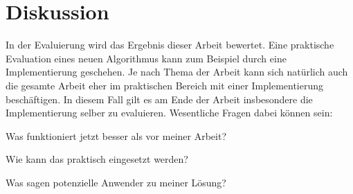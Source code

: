 
\chapter{Diskussion}
\label{chapter:diskussion}

In der Evaluierung wird das Ergebnis dieser Arbeit bewertet. Eine praktische Evaluation eines neuen Algorithmus kann zum Beispiel durch eine Implementierung geschehen. Je nach Thema der Arbeit kann sich natürlich auch die gesamte Arbeit eher im praktischen Bereich mit einer Implementierung beschäftigen. In diesem Fall gilt es am Ende der Arbeit insbesondere die Implementierung selber zu evaluieren. Wesentliche Fragen dabei können sein:
\begin{compactitem}[--]
  \item Was funktioniert jetzt besser als vor meiner Arbeit?
  \item Wie kann das praktisch eingesetzt werden?
  \item Was sagen potenzielle Anwender zu meiner Lösung?
\end{compactitem}

